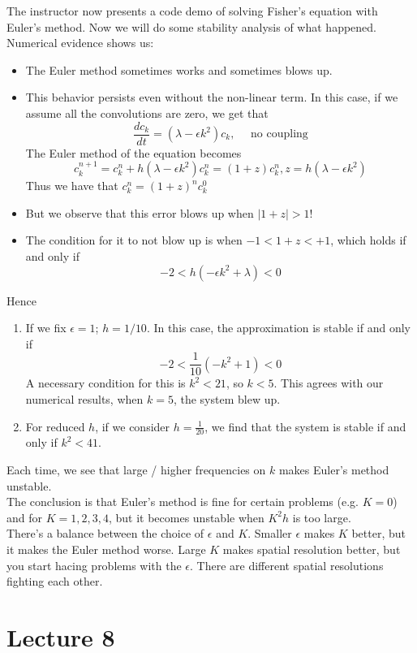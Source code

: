 \documentclass{article}
\begin{document}
The instructor now presents a code demo of solving Fisher's equation with Euler's method. Now we will do some stability analysis of what happened. Numerical evidence shows us:
\begin{itemize}
    \item The Euler method sometimes works and sometimes blows up.
    \item This behavior persists even without the non-linear term. In this case, if we assume all the convolutions are zero, we get that
    \[\frac{dc_k}{dt} = (\lambda - \epsilon k^2) c_k,\quad \text{ no coupling}\]
    The Euler method of the equation becomes
    \[c_k^{n+1} = c_k^n + h(\lambda - \epsilon k^2) c_k^n = (1 + z) c_k^n, z = h(\lambda - \epsilon k^2)\]
    Thus we have that $c_k^n = (1 + z)^n c_k^0$
    \item But we observe that this error blows up when $|1 + z| > 1$!
    \item The condition for it to not blow up is when $-1 < 1 + z < +1$, which holds if and only if
    \[-2 < h(-\epsilon k^2 + \lambda) < 0\]
\end{itemize}

Hence 
\begin{enumerate}
    \item If we fix $\epsilon = 1$; $h = 1/10$. In this case, the approximation is stable if and only if
    \[-2 < \frac{1}{10} (-k^2 + 1) < 0\]
    A necessary condition for this is $k^2 < 21$, so $k < 5$. This agrees with our numerical results, when $k = 5$, the system blew up.
    \item For reduced $h$, if we consider $h = \frac{1}{20}$, we find that the system is stable if and only if $k^2 < 41$.
\end{enumerate}
Each time, we see that large / higher frequencies on $k$ makes Euler's method unstable.\\

The conclusion is that Euler's method is fine for certain problems (e.g. $K = 0$) and for $K = 1, 2, 3, 4$, but it becomes unstable when $K^2 h$ is too large.\\

There's a balance between the choice of $\epsilon$ and $K$. Smaller $\epsilon$ makes $K$ better, but it makes the Euler method worse. Large $K$ makes spatial resolution better, but you start hacing problems with the $\epsilon$. There are different spatial resolutions fighting each other.

\newpage
\section{Lecture 8}
\end{document}
